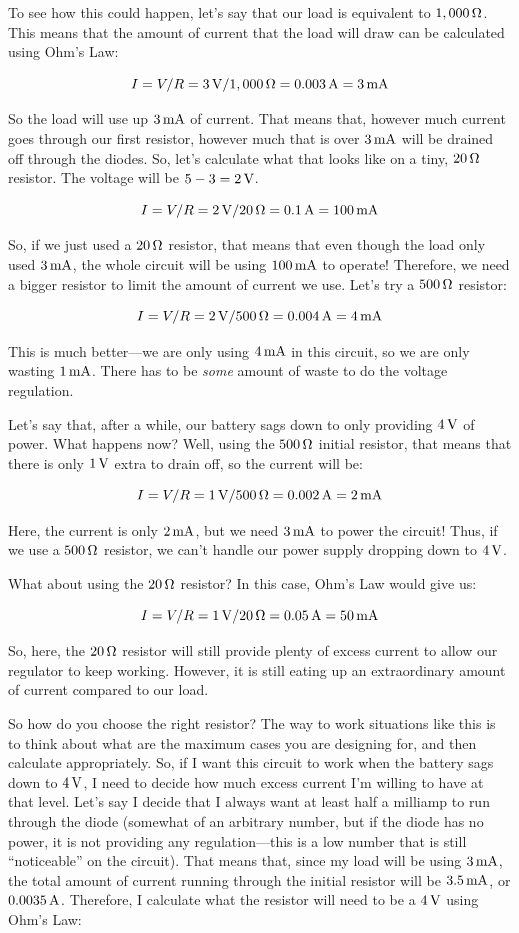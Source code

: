 To see how this could happen, let's say that our load is equivalent to $1,000\,\si{\ohm}$.
This means that the amount of current that the load will draw can be calculated using Ohm's Law:

$$ I = V / R = 3\,\si{\volt} / 1,000\,\si{\ohm} = 0.003\,\si{\ampere} = 3\,\si{\milli\ampere} $$

So the load will use up $3\,\si{\milli\ampere}$ of current.
That means that, however much current goes through our first resistor, however much that is over $3\,\si{\milli\ampere}$ will be drained off through the diodes.
So, let's calculate what that looks like on a tiny, $20\,\si{\ohm}$ resistor.
The voltage will be $5 - 3 = 2\,\si{\volt}$.

$$ I = V / R = 2\,\si{\volt} / 20\,\si{\ohm} = 0.1\,\si{\ampere} = 100\,\si{\milli\ampere} $$

So, if we just used a $20\,\si{\ohm}$ resistor, that means that even though the load only used $3\,\si{\milli\ampere}$, the whole circuit will be using $100\,\si{\milli\ampere}$ to operate!
Therefore, we need a bigger resistor to limit the amount of current we use.
Let's try a $500\,\si{\ohm}$ resistor:

$$ I = V / R = 2\,\si{\volt} / 500\,\si{\ohm} = 0.004\,\si{\ampere} = 4\,\si{\milli\ampere} $$

This is much better---we are only using $4\,\si{\milli\ampere}$ in this circuit, so we are only wasting $1\,\si{\milli\ampere}$.
There has to be \emph{some} amount of waste to do the voltage regulation.

Let's say that, after a while, our battery sags down to only providing $4\,\si{\volt}$ of power.
What happens now?
Well, using the $500\,\si{\ohm}$ initial resistor, that means that there is only $1\,\si{\volt}$ extra to drain off, so the current will be:

$$ I = V / R = 1\,\si{\volt} / 500\,\si{\ohm} = 0.002\,\si{\ampere} = 2\,\si{\milli\ampere} $$

Here, the current is only $2\,\si{\milli\ampere}$, but we need $3\,\si{\milli\ampere}$ to power the circuit!
Thus, if we use a $500\,\si{\ohm}$ resistor, we can't handle our power supply dropping down to $4\,\si{\volt}$.

What about using the $20\,\si{\ohm}$ resistor?
In this case, Ohm's Law would give us:

$$ I = V / R = 1\,\si{\volt} / 20\,\si{\ohm} = 0.05\,\si{\ampere} = 50\,\si{\milli\ampere} $$

So, here, the $20\,\si{\ohm}$ resistor will still provide plenty of excess current to allow our regulator to keep working.
However, it is still eating up an extraordinary amount of current compared to our load.

So how do you choose the right resistor?
The way to work situations like this is to think about what are the maximum cases you are designing for, and then calculate appropriately.
So, if I want this circuit to work when the battery sags down to $4\,\si{\volt}$, I need to decide how much excess current I'm willing to have at that level.
Let's say I decide that I always want at least half a milliamp to run through the diode (somewhat of an arbitrary number, but if the diode has no power, it is not providing any regulation---this is a low number that is still ``noticeable'' on the circuit).
That means that, since my load will be using $3\,\si{\milli\ampere}$, the total amount of current running through the initial resistor will be $3.5\,\si{\milli\ampere}$, or $0.0035\,\si{\ampere}$.
Therefore, I calculate what the resistor will need to be a $4\,\si{\volt}$ using Ohm's Law:


